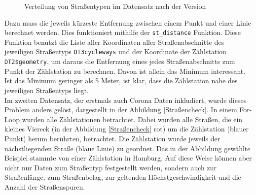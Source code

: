 \documentclass[a4paper,12pt]{thesis}
\begin{document}
\begin{figure}[!ht]%
	\centering
	\qquad
	\caption{Verteilung von Straßentypen im Datensatz nach der Version}
	\label{Straßentypen}%
\end{figure}

Dazu muss die jeweils kürzeste Entfernung zwischen einem Punkt und einer Linie berechnet werden. Dies funktioniert mithilfe der \lstinline|st_distance| Funktion. Diese Funktion benutzt die Liste aller Koordinaten aller Straßenabschnitte des jeweiligen Straßentyps \lstinline|DT3cycleways| und der Koordinate der Zählstation \lstinline|DT2$geometry|, um daraus die Entfernung eines jedes Straßenabschnitts zum Punkt der Zählstation zu berechnen. Davon ist allein das Minimum interessant. Ist das Minimum geringer als 5 Meter, ist klar, dass die Zählstation nahe des jeweiligen Straßentyps liegt.\\

Im zweiten Datensatz, der erstmals auch Corona Daten inkludiert, wurde dieses Problem anders gelöst, dargestellt in der Abbildung \ref{Straßencheck}. In einem For-Loop wurden alle Zählstationen betrachtet. Dabei wurden alle Straßen, die ein kleines Viereck (in der Abbildung \ref{Straßencheck} rot) um die Zählstation (blauer Punkt) herum berührten, betrachtet. Die Zählstation wurde jeweils der nächstliegenden Straße (blaue Linie) zu geordnet. Das in der Abbildung gewählte Beispiel stammte von einer Zählstation in Hamburg. Auf diese Weise können aber nicht nur Daten zum Straßentyp festgestellt werden, sondern auch zur Straßenlänge, zum Straßenbelag, zur geltenden Höchstgeschwindigkeit und die Anzahl der Straßenspuren.\\
\end{document}
